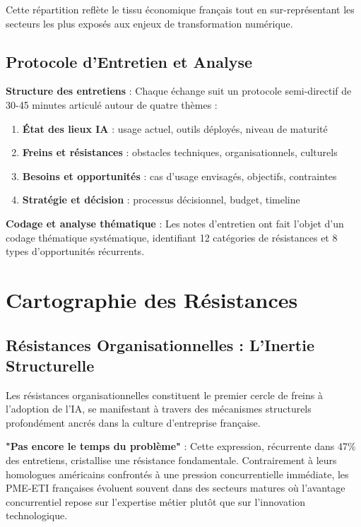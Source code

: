 \documentclass[12pt,a4paper]{report}
\begin{document}
Cette répartition reflète le tissu économique français tout en sur-représentant les secteurs les plus exposés aux enjeux de transformation numérique.

\subsection{Protocole d'Entretien et Analyse}

\textbf{Structure des entretiens} : Chaque échange suit un protocole semi-directif de 30-45 minutes articulé autour de quatre thèmes :
\begin{enumerate}
\item \textbf{État des lieux IA} : usage actuel, outils déployés, niveau de maturité
\item \textbf{Freins et résistances} : obstacles techniques, organisationnels, culturels
\item \textbf{Besoins et opportunités} : cas d'usage envisagés, objectifs, contraintes
\item \textbf{Stratégie et décision} : processus décisionnel, budget, timeline
\end{enumerate}

\textbf{Codage et analyse thématique} : Les notes d'entretien ont fait l'objet d'un codage thématique systématique, identifiant 12 catégories de résistances et 8 types d'opportunités récurrents.

\section{Cartographie des Résistances}

\subsection{Résistances Organisationnelles : L'Inertie Structurelle}

Les résistances organisationnelles constituent le premier cercle de freins à l'adoption de l'IA, se manifestant à travers des mécanismes structurels profondément ancrés dans la culture d'entreprise française.

\textbf{"Pas encore le temps du problème"} : Cette expression, récurrente dans 47\% des entretiens, cristallise une résistance fondamentale. Contrairement à leurs homologues américains confrontés à une pression concurrentielle immédiate, les PME-ETI françaises évoluent souvent dans des secteurs matures où l'avantage concurrentiel repose sur l'expertise métier plutôt que sur l'innovation technologique.
\end{document}
